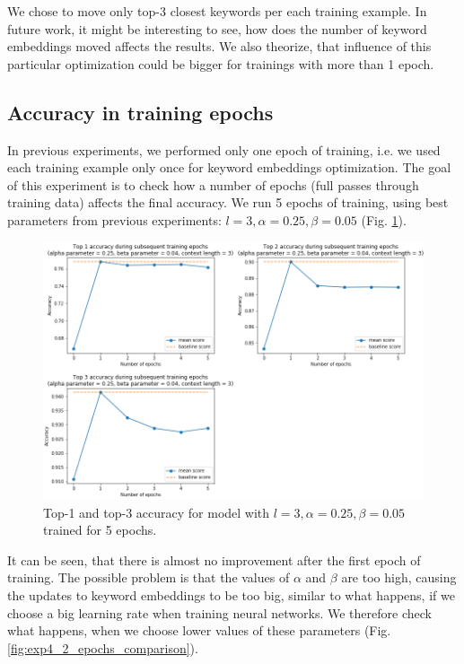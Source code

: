 \documentclass{llncs}
\begin{document}
We chose to move only top-3 closest keywords per each training example. In future work, it might be interesting to see, how does the number of keyword embeddings moved affects the results. We also theorize, that influence of this particular optimization could be bigger for trainings with more than 1 epoch.

\subsection{Accuracy in training epochs}
\label{sec:exp_epochs}
In previous experiments, we performed only one epoch of training, i.e. we used each training example only once for keyword embeddings optimization.
The goal of this experiment is to check how a number of epochs (full passes through training data) affects the final accuracy.
We run 5 epochs of training, using best parameters from previous experiments: \(l=3, \alpha=0.25, \beta=0.05\) (Fig. \ref{fig:exp4_1_epochs_fixed}).

\begin{figure}
    \centering
    \caption{Top-1 and top-3 accuracy for model with \(l=3, \alpha=0.25, \beta=0.05\) trained for 5 epochs.}
    \label{fig:exp4_1_epochs_fixed}
    \includegraphics[scale=0.65]{res/exp4_epoch_top_acc.png}
\end{figure}

It can be seen, that there is almost no improvement after the first epoch of training.
The possible problem is that the values of \(\alpha\) and \(\beta\) are too high, causing the updates to keyword embeddings to be too big, similar to what happens, if we choose a big learning rate when training neural networks.
We therefore check what happens, when we choose lower values of these parameters (Fig. \ref{fig:exp4_2_epochs_comparison}).
\end{document}
